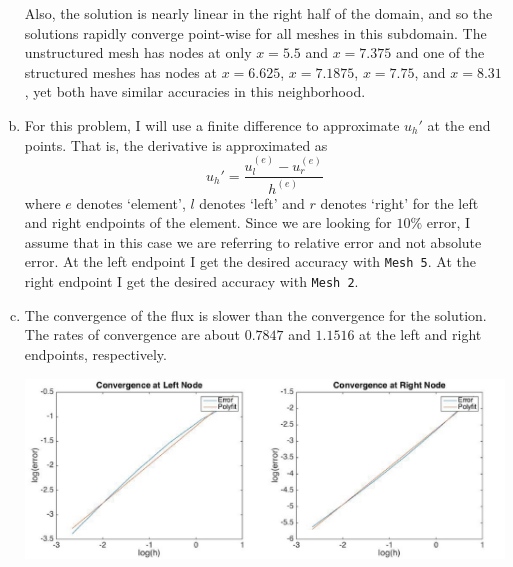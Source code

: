 \documentclass[11pt]{article}
\begin{document}
\begin{enumerate}[(a)]
Also, the solution is nearly linear in the right half of the domain, and so the solutions rapidly converge  point-wise for all meshes in this subdomain.  The unstructured mesh has nodes at only $x = 5.5$ and $x = 7.375$ and one of the structured meshes has nodes at $x = 6.625$, $x = 7.1875$, $x =7.75$, and $x =8.31$, yet both have similar accuracies in this neighborhood.
\item For this problem, I will use a finite difference to approximate $u_h'$ at the end points. That is, the derivative is approximated as
\begin{equation*}
u_h' = \frac{u^{(e)}_l- u^{(e)}_r}{h^{(e)}}
\end{equation*}
where $e$ denotes `element', $l$ denotes `left' and $r$ denotes `right' for the left and right endpoints of the element. Since we are looking for $10\%$ error, I assume that in this case we are referring to relative error and not absolute error. At the left endpoint I get the desired accuracy with \texttt{Mesh 5}. At the right endpoint I get the desired accuracy with \texttt{Mesh 2}.
\item The convergence of the flux is slower than the convergence for the solution. The rates of convergence are about $0.7847$ and $1.1516$ at the left and right endpoints, respectively. 
\begin{center}
\includegraphics[width=\textwidth]{convergence.png}
\end{center}
\end{enumerate}
\end{document}
